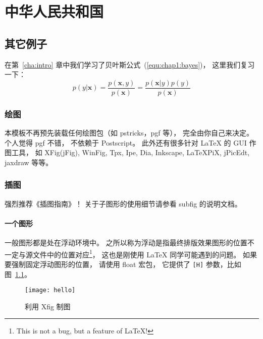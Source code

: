 % 
% 
% 
% 
% 
% 

\chapter{中华人民共和国}
\label{chapter:china}

\section{其它例子}
\label{section:other}

在第~\ref{cha:intro} 章中我们学习了贝叶斯公式~(\ref{equ:chap1:bayes})，
这里我们复习一下：
\begin{equation}
\label{equ:chap2:bayes}
p(y|\mathbf{x}) = \frac{p(\mathbf{x},y)}{p(\mathbf{x})}=
\frac{p(\mathbf{x}|y)p(y)}{p(\mathbf{x})} 
\end{equation}

\subsection{绘图}
\label{subsection:draw}

本模板不再预先装载任何绘图包（如 \textsf{pstricks，pgf} 等），
完全由你自己来决定。
个人觉得 \textsf{pgf} 不错，
不依赖于 Postscript。
此外还有很多针对 \LaTeX{} 的 GUI 作图工具，
如 XFig(jFig), WinFig, Tpx, Ipe, Dia, Inkscape, LaTeXPiX,
jPicEdt, jaxdraw 等等。

\subsection{插图}
\label{subsection:graphs}

强烈推荐《\LaTeXe 插图指南》！
关于子图形的使用细节请参看 \textsf{subfig} 的说明文档。

\subsubsection{一个图形}
\label{section:onefig}
一般图形都是处在浮动环境中。
之所以称为浮动是指最终排版效果图形的位置不一定与源文件中的位置对应\footnote{This is not a bug, but a feature of \LaTeX!}，
这也是刚使用 \LaTeX{} 同学可能遇到的问题。
如果要强制固定浮动图形的位置，
请使用 \textsf{float} 宏包，
它提供了 \texttt{[H]} 参数，比如图~\ref{fig:xfig1}。
\begin{figure}[H] %
  \centering
  \texttt{[image: hello]}
  \caption{利用 Xfig 制图}
  \label{fig:xfig1}
\end{figure}

